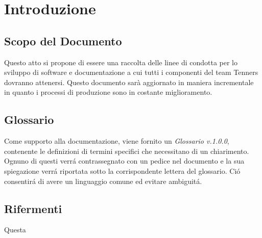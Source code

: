 \section{Introduzione}

\subsection{Scopo del Documento}
Questo atto si propone di essere una raccolta delle linee di condotta per lo
sviluppo di software e documentazione a cui tutti i componenti del team Tenners
dovranno attenersi.
Questo documento sar\`a aggiornato in maniera incrementale in quanto i processi
di produzione sono in costante miglioramento.


\subsection{Glossario}
Come supporto alla documentazione, viene fornito un \textit{Glossario v.1.0.0},
contenente le definizioni di termini specifici che necessitano di un chiarimento.
Ognuno di questi verr\'a contrassegnato con un pedice \glo nel documento e la sua
spiegazione verr\'a riportata sotto la corrispondente lettera del glossario. Ci\'o
consentir\'a di avere un linguaggio comune ed evitare ambiguit\'a.

\subsection{Rifermenti}
Questa
